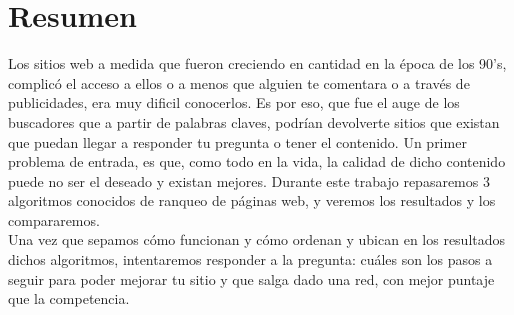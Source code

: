 \section{Resumen}

Los sitios web a medida que fueron creciendo en cantidad en la época de los 90's, complicó el acceso a ellos o a menos que alguien te comentara o a través de publicidades, era muy dificil conocerlos. Es por eso, que fue el auge de los buscadores que a partir de palabras claves, podrían devolverte sitios que existan que puedan llegar a responder tu pregunta o tener el contenido. Un primer problema de entrada, es que, como todo en la vida, la calidad de dicho contenido puede no ser el deseado y existan mejores. Durante este trabajo repasaremos 3 algoritmos conocidos de ranqueo de páginas web, y veremos los resultados y los compararemos. \\
Una vez que sepamos cómo funcionan y cómo ordenan y ubican en los resultados dichos algoritmos, intentaremos responder a la pregunta: cuáles son los pasos a seguir para poder mejorar tu sitio y que salga dado una red, con mejor puntaje que la competencia.

